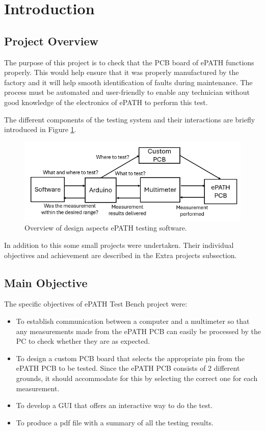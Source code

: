 \section{Introduction}
\subsection{Project Overview}
The purpose of this project is to check that the PCB board of ePATH functions properly. This would help ensure that it was properly manufactured by the factory and it will help smooth identification of faults during maintenance. The process must be automated and user-friendly to enable any technician without good knowledge of the electronics of ePATH to perform this test. 

The different components of the testing system and their interactions are briefly introduced in Figure \ref{end_goal_diagram}.


\begin{figure}[H]
          \centering
          \includegraphics[width=1\linewidth]{img/General end goal diagram.png}
          \caption{Overview of design aspects ePATH testing software.}
          \label{end_goal_diagram}
    \end{figure}

In addition to this some small projects were undertaken. Their individual objectives and achievement are described in the Extra projects subsection.

\subsection{Main Objective}
The specific objectives of ePATH Test Bench project were: 
\begin{itemize}
\item To establish communication between a computer and a multimeter so that any measurements made from the ePATH PCB can easily be processed by the PC to check whether they are as expected.
\item To design a custom PCB board that selects the appropriate pin from the ePATH PCB to be tested. Since the ePATH PCB consists of 2 different grounds, it should accommodate for this by selecting the correct one for each measurement.
\item To develop a GUI that offers an interactive way to do the test.
\item To produce a pdf file with a summary of all the testing results.
\end{itemize}

